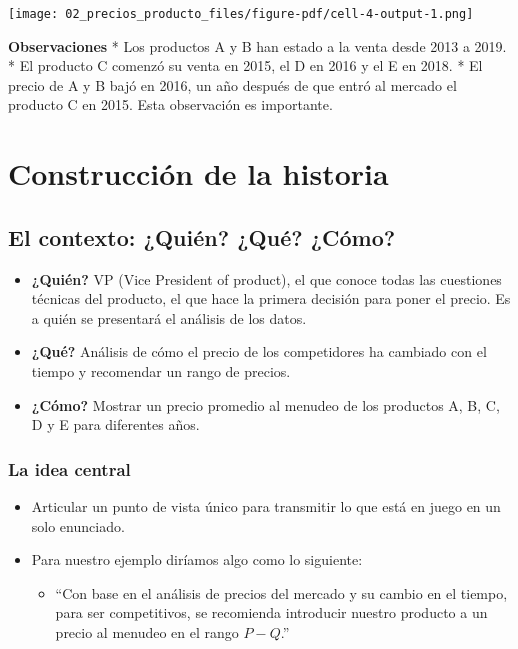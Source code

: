 \documentclass[
  letterpaper,
  DIV=11,
  numbers=noendperiod]{scrreprt}
\providecommand{\tightlist}{%
  \setlength{\itemsep}{0pt}\setlength{\parskip}{0pt}}\usepackage{longtable,booktabs,array}
\begin{document}
\texttt{[image: 02\_precios\_producto\_files/figure-pdf/cell-4-output-1.png]}

\textbf{Observaciones} * Los productos A y B han estado a la venta desde
2013 a 2019. * El producto C comenzó su venta en 2015, el D en 2016 y el
E en 2018. * El precio de A y B bajó en 2016, un año después de que
entró al mercado el producto C en 2015. Esta observación es importante.

\section{Construcción de la
historia}\label{construcciuxf3n-de-la-historia}

\subsection{El contexto: ¿Quién? ¿Qué?
¿Cómo?}\label{el-contexto-quiuxe9n-quuxe9-cuxf3mo}

\begin{itemize}
\item
  \textbf{¿Quién?} VP (Vice President of product), el que conoce todas
  las cuestiones técnicas del producto, el que hace la primera decisión
  para poner el precio. Es a quién se presentará el análisis de los
  datos.
\item
  \textbf{¿Qué?} Análisis de cómo el precio de los competidores ha
  cambiado con el tiempo y recomendar un rango de precios.
\item
  \textbf{¿Cómo?} Mostrar un precio promedio al menudeo de los productos
  A, B, C, D y E para diferentes años.
\end{itemize}

\subsubsection{La idea central}\label{la-idea-central}

\begin{itemize}
\tightlist
\item
  Articular un punto de vista único para transmitir lo que está en juego
  en un solo enunciado.
\item
  Para nuestro ejemplo diríamos algo como lo siguiente:

  \begin{itemize}
  \tightlist
  \item
    ``Con base en el análisis de precios del mercado y su cambio en el
    tiempo, para ser competitivos, se recomienda introducir nuestro
    producto a un precio al menudeo en el rango \(P - Q\).''
  \end{itemize}
\end{itemize}
\end{document}
